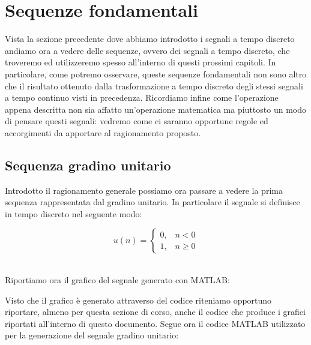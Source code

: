 \documentclass[../main.tex]{subfiles}
\begin{document}

\clearpage
\thispagestyle{empty}
\vspace*{7cm}
\section{Sequenze fondamentali}
\vspace*{1.5cm}

Vista la sezione precedente dove abbiamo introdotto i segnali a tempo discreto andiamo ora a vedere delle sequenze, ovvero dei segnali a tempo discreto, che troveremo ed utilizzeremo spesso all'interno di questi prossimi capitoli.
In particolare, come potremo osservare, queste sequenze fondamentali non sono altro che il risultato ottenuto dalla trasformazione a tempo discreto degli stessi segnali a tempo continuo visti in precedenza. Ricordiamo infine come l'operazione appena descritta non sia affatto un'operazione matematica ma piuttosto un modo di pensare questi segnali: vedremo come ci saranno opportune regole ed accorgimenti da apportare al ragionamento proposto.

\subsection{Sequenza gradino unitario}

Introdotto il ragionamento generale possiamo ora passare a vedere la prima sequenza rappresentata dal gradino unitario.
In particolare il segnale si definisce in tempo discreto nel seguente modo:

\[ u(n) = \begin{cases}
	0, \hspace{10pt} n < 0\\
	1, \hspace{10pt} n \geq 0
\end{cases} \]\

Riportiamo ora il grafico del segnale generato con MATLAB:


Visto che il grafico è generato attraverso del codice riteniamo opportuno riportare, almeno per questa sezione di corso, anche il codice che produce i grafici riportati all'interno di questo documento.
Segue ora il codice MATLAB utilizzato per la generazione del segnale gradino unitario:\\


\end{document}

